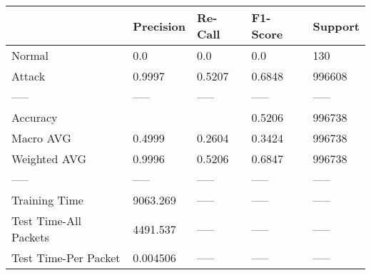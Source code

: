 \begin{tabular}{lllll}
\toprule
{} & Precision & Re-Call & F1-Score & Support \\
\midrule
Normal                &       0.0 &     0.0 &      0.0 &     130 \\
Attack                &    0.9997 &  0.5207 &   0.6848 &  996608 \\
-----                 &     ----- &   ----- &    ----- &   ----- \\
Accuracy              &           &         &   0.5206 &  996738 \\
Macro AVG             &    0.4999 &  0.2604 &   0.3424 &  996738 \\
Weighted AVG          &    0.9996 &  0.5206 &   0.6847 &  996738 \\
-----                 &     ----- &   ----- &    ----- &   ----- \\
Training Time         &  9063.269 &   ----- &    ----- &   ----- \\
Test Time-All Packets &  4491.537 &   ----- &    ----- &   ----- \\
Test Time-Per Packet  &  0.004506 &   ----- &    ----- &   ----- \\
\bottomrule
\end{tabular}
